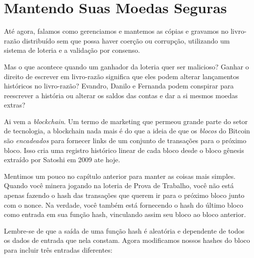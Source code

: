 \chapter*{Mantendo Suas Moedas Seguras}
\label{ch:capitulo6}
\setcounter{chapter}{6}
Até agora, falamos como gerenciamos e mantemos as cópias e gravamos no livro-razão distribuído sem que possa haver coerção ou corrupção, utilizando um sistema de loteria e a validação por consenso.

Mas o que acontece quando um ganhador da loteria quer ser malicioso? Ganhar o direito de escrever em livro-razão significa que eles podem alterar lançamentos históricos no livro-razão? Evandro, Danilo e Fernanda podem conspirar para reescrever a história ou alterar os saldos das contas e dar a si mesmos moedas extras?

Ai vem a \textit{blockchain}. Um termo de marketing que permeou grande parte do setor de tecnologia, a blockchain nada mais é do que a ideia de que os \textit{blocos} do Bitcoin são \textit{encadeados} para fornecer links de um conjunto de transações para o próximo bloco.
Isso cria uma registro histórico linear de cada bloco desde o bloco gênesis extraído por Satoshi em 2009 ate hoje.

Mentimos um pouco no capítulo anterior para manter as coisas mais simples.
Quando você minera jogando na loteria de Prova de Trabalho, você não está apenas fazendo o hash das transações que querem ir para o próximo bloco junto com o nonce.
Na verdade, você também está fornecendo o hash do último bloco como entrada em sua função hash, vinculando assim seu bloco ao bloco anterior.






Lembre-se de que a saída de uma função hash é aleatória e dependente de todos os dados de entrada que nela constam. 
Agora modificamos nossos hashes do bloco para incluir três entradas diferentes:

